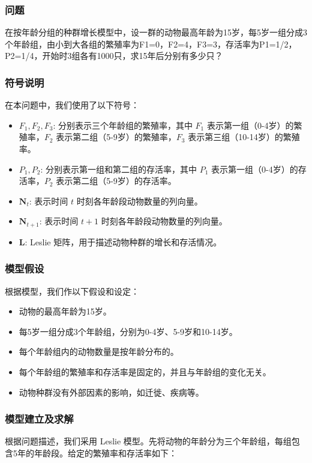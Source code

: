 \documentclass[a4,10pt,zihao=-4]{ctexart}
\begin{document}
\subsubsection{问题}
在按年龄分组的种群增长模型中，设一群的动物最高年龄为15岁，每5岁一组分成3个年龄组，由小到大各组的繁殖率为F1=0，F2=4，F3=3，存活率为P1=1/2，P2=1/4，开始时3组各有1000只，求15年后分别有多少只？


\subsubsection{符号说明}
在本问题中，我们使用了以下符号：
\begin{itemize}
    \item $F_1, F_2, F_3$: 分别表示三个年龄组的繁殖率，其中 $F_1$ 表示第一组（0-4岁）的繁殖率，$F_2$ 表示第二组（5-9岁）的繁殖率，$F_3$ 表示第三组（10-14岁）的繁殖率。
    \item $P_1, P_2$: 分别表示第一组和第二组的存活率，其中 $P_1$ 表示第一组（0-4岁）的存活率，$P_2$ 表示第二组（5-9岁）的存活率。
    \item $\mathbf{N}_t$: 表示时间 $t$ 时刻各年龄段动物数量的列向量。
    \item $\mathbf{N}_{t+1}$: 表示时间 $t+1$ 时刻各年龄段动物数量的列向量。
    \item $\mathbf{L}$: Leslie 矩阵，用于描述动物种群的增长和存活情况。
\end{itemize}


\subsubsection{模型假设}
根据模型，我们作以下假设和设定：
\begin{itemize}
    \item 动物的最高年龄为15岁。
    \item 每5岁一组分成3个年龄组，分别为0-4岁、5-9岁和10-14岁。
    \item 每个年龄组内的动物数量是按年龄分布的。
    \item 每个年龄组的繁殖率和存活率是固定的，并且与年龄组的变化无关。
    \item 动物种群没有外部因素的影响，如迁徙、疾病等。
\end{itemize}



\subsubsection{模型建立及求解}
根据问题描述，我们采用 Leslie 模型。先将动物的年龄分为三个年龄组，每组包含5年的年龄段。给定的繁殖率和存活率如下：
\end{document}
